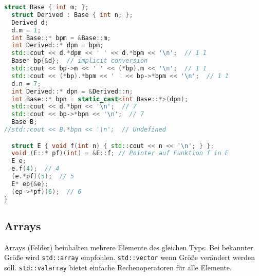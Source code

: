 \documentclass[10pt,twocolumn]{scrartcl}
\begin{document}
\begin{lstlisting}[language=C++]
  struct Base { int m; };
  struct Derived : Base { int n; };
  Derived d;
  d.m = 1;
  int Base::* bpm = &Base::m;
  int Derived::* dpm = bpm;
  std::cout << d.*dpm << ' ' << d.*bpm << '\n';  // 1 1
  Base* bp{&d};  // implicit conversion
  std::cout << bp->m << ' ' << (*bp).m << '\n';  // 1 1
  std::cout << (*bp).*bpm << ' ' << bp->*bpm << '\n';  // 1 1
  d.n = 7;
  int Derived::* dpn = &Derived::n;
  int Base::* bpn = static_cast<int Base::*>(dpn);
  std::cout << d.*bpn << '\n';  // 7
  std::cout << bp->*bpn << '\n';  // 7
  Base B;
//std::cout << B.*bpn << '\n';  // Undefined

  struct E { void f(int n) { std::cout << n << '\n'; } };
  void (E::* pf)(int) = &E::f; // Pointer auf Funktion f in E
  E e;
  e.f(4);  // 4
  (e.*pf)(5);  // 5
  E* ep{&e};
  (ep->*pf)(6);  // 6
}
\end{lstlisting}

\subsection{Arrays}

Arrays (Felder) beinhalten mehrere Elemente des gleichen Typs. Bei bekannter
Größe wird \lstinline|std::array| empfohlen. \lstinline|std::vector| wenn Größe
verändert werden soll. \lstinline|std::valarray| bietet einfache
Rechenoperatoren für alle Elemente.
\end{document}
